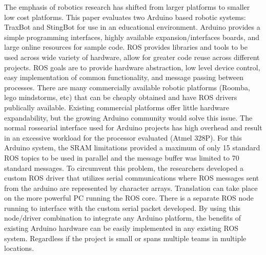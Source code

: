 The emphasis of robotics research has shifted from larger platforms to smaller low cost platforms. This paper evaluates two Arduino based robotic systems: TraxBot and StingBot for use in an educational  environment. Arduino provides a simple programming interfaces, highly available expansion/interfaces boards, and large online resources for sample code. ROS provides libraries and tools to be used across wide variety of hardware, allow for greater code reuse across different projects. ROS goals are to provide hardware abstraction, low level device control, easy implementation of common functionality, and message passing between processes. There are many commercially available robotic platforms (Roomba, lego mindstorms, etc) that can be cheaply obtained and have ROS drivers publically available. Existing commercial platforms offer little hardware expandability, but the growing Arduino community would solve this issue. 
The normal rossearial interface used for Arduino projects has high overhead and result in an excessive workload for the processor evaluated (Atmel 328P). For this Arduino system, the SRAM limitations provided a maximum of only 15 standard ROS topics to be used in parallel and the message buffer was limited to 70 standard messages. To circumvent this problem, the researchers developed a custom ROS driver that utilizes serial communications where ROS messages sent from the arduino are represented by character arrays. Translation can take place on the more powerful PC running the ROS core. There is a separate ROS node running to interface with the custom serial packet developed. By using this node/driver combination to integrate any Arduino platform, the benefits of existing Arduino hardware can be easily implemented in any existing ROS system. Regardless if the project is small or spans multiple teams in multiple locations. 





